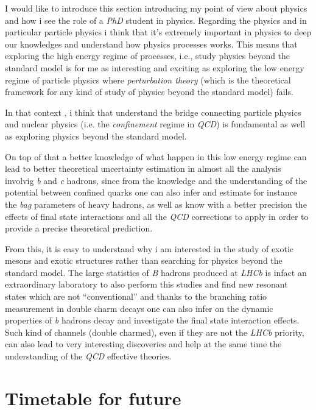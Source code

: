 \documentclass[paper=a4, fontsize=10pt]{scrartcl}
\numberwithin{equation}{section}		%
\numberwithin{figure}{section}			%
\numberwithin{table}{section}				%
\begin{document}
I would like to introduce this section introducing my point of view about physics and how i see the role of a \textit{PhD} student in physics. Regarding the physics and in particular particle physics i think that it's extremely important in physics to deep our knowledges and understand how physics processes works. This means that exploring the high energy regime of processes, i.e., study physics beyond the standard model is for me as interesting and exciting as exploring the low energy regime of particle physics where \textit{perturbation theory} (which is the theoretical framework for any kind of study of physics beyond the standard model) fails.

In that context , i think that understand the bridge connecting particle physics and nuclear physics (i.e. the \textit{confinement} regime in \textit{QCD}) is fundamental as well as exploring physics beyond the standard model.

On top of that a better knowledge of what happen in this low energy regime can lead to better theoretical uncertainty estimation in almost all the analysis involvig \textit{b} and \textit{c} hadrons, since from the knowledge and the understanding of the potential between confined quarks one can also infer and estimate for instance the \textit{bag} parameters of heavy hadrons, as well as know with a better precision the effects of final state interactions and all the \textit{QCD} corrections to apply in order to provide a precise theoretical prediction. 

From this, it is easy to understand why i am interested in the study of exotic mesons and exotic structures rather than searching for physics beyond the standard model. The large statistics of \textit{B} hadrons produced at \textit{LHCb} is infact an extraordinary laboratory to also perform this studies and find new resonant states which are not ``conventional'' and thanks to the branching ratio measurement in double charm decays one can also infer on the dynamic properties of \textit{b} hadrons decay and investigate the final state interaction effects. Such kind of channels (double charmed), even if they are not the \textit{LHCb} priority, can also lead to very interesting discoveries and help at the same time the understanding of the \textit{QCD} effective theories.
\section{Timetable for future}
\end{document}
